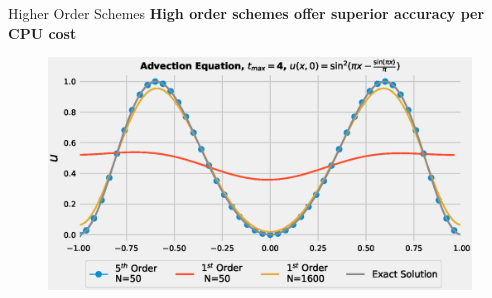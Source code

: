 \documentclass[10pt]{beamer}
\begin{document}
\begin{frame}{Higher Order Schemes}
  \centering 
  \textbf{High order schemes offer superior accuracy per CPU cost}
  
  \begin{table}[H]
    \centering
      \tabcolsep=0.3cm
  \end{table}
  \begin{figure}[H]
      \centering
      \includegraphics[scale=0.45]{AdvectionHighOrderComparison2.eps}
    \end{figure}
\end{frame}
\end{document}
